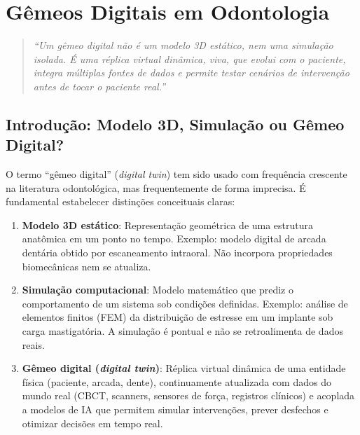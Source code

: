 \chapter{Gêmeos Digitais em Odontologia}
\label{cap:gemeos-digitais-odontologia}
\nivelquatro

\begin{quote}
\textit{``Um gêmeo digital não é um modelo 3D estático, nem uma simulação isolada. É uma réplica virtual dinâmica, viva, que evolui com o paciente, integra múltiplas fontes de dados e permite testar cenários de intervenção antes de tocar o paciente real.''}
\end{quote}

\section{Introdução: Modelo 3D, Simulação ou Gêmeo Digital?}

O termo ``gêmeo digital'' (\textit{digital twin}) tem sido usado com frequência crescente na literatura odontológica, mas frequentemente de forma imprecisa. É fundamental estabelecer distinções conceituais claras:

\begin{enumerate}
    \item \textbf{Modelo 3D estático}: Representação geométrica de uma estrutura anatômica em um ponto no tempo. Exemplo: modelo digital de arcada dentária obtido por escaneamento intraoral. Não incorpora propriedades biomecânicas nem se atualiza.

    \item \textbf{Simulação computacional}: Modelo matemático que prediz o comportamento de um sistema sob condições definidas. Exemplo: análise de elementos finitos (FEM) da distribuição de estresse em um implante sob carga mastigatória. A simulação é pontual e não se retroalimenta de dados reais.

    \item \textbf{Gêmeo digital (\textit{digital twin})}: Réplica virtual dinâmica de uma entidade física (paciente, arcada, dente), continuamente atualizada com dados do mundo real (CBCT, scanners, sensores de força, registros clínicos) e acoplada a modelos de IA que permitem simular intervenções, prever desfechos e otimizar decisões em tempo real.
\end{enumerate}

